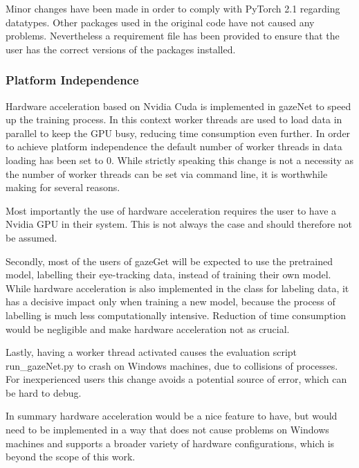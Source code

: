 \documentclass[acmlarge]{acmart}
\begin{document}
Minor changes have been made in order to comply with PyTorch 2.1 regarding datatypes. Other packages used in the original code have not caused any problems. Nevertheless a requirement file has been provided to ensure that the user has the correct versions of the packages installed.


\subsubsection{Platform Independence}
Hardware acceleration based on Nvidia Cuda is implemented in gazeNet to speed up the training process. In this context worker threads are used to load data in parallel to keep the GPU busy, reducing time consumption even further. In order to achieve platform independence the default number of worker threads in data loading has been set to 0. While strictly speaking this change is not a necessity as the number of worker threads can be set via command line, it is worthwhile making for several reasons.

Most importantly the use of hardware acceleration requires the user to have a Nvidia GPU in their system. This is not always the case and should therefore not be assumed.

Secondly, most of the users of gazeGet will be expected to use the pretrained model, labelling their eye-tracking data, instead of training their own model. While hardware acceleration is also implemented in the class for labeling data, it has a decisive impact only when training a new model, because the process of labelling is much less computationally intensive. Reduction of time consumption would be negligible and make hardware acceleration not as crucial.

Lastly, having a worker thread activated causes the evaluation script run\_gazeNet.py to crash on Windows machines, due to collisions of processes. For inexperienced users this change avoids a potential source of error, which can be hard to debug. %

In summary hardware acceleration would be a nice feature to have, but would need to be implemented in a way that does not cause problems on Windows machines and supports a broader variety of hardware configurations, which is beyond the scope of this work.
\end{document}
